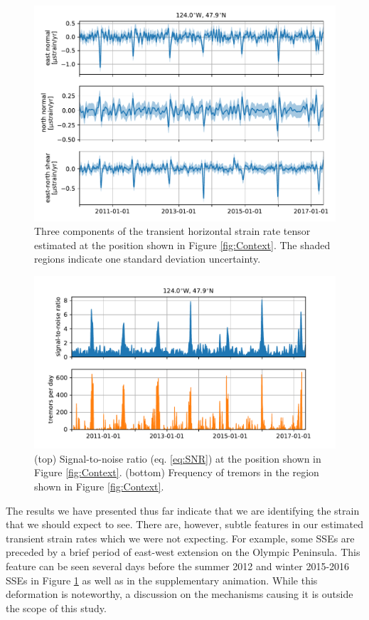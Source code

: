 \documentclass[extra,mreferee]{gji}
\begin{document}
\begin{figure}
\includegraphics{figures/strain_ts/strain-ts.pdf}
\caption{
Three components of the transient horizontal strain rate tensor
estimated at the position shown in Figure \ref{fig:Context}. The
shaded regions indicate one standard deviation uncertainty.
}   
\label{fig:StrainTs}
\end{figure}

\begin{figure}
\includegraphics{figures/strain_ts/mag-ts.pdf}
\caption{
(top) Signal-to-noise ratio (eq. \ref{eq:SNR}) at the position shown
in Figure \ref{fig:Context}. (bottom) Frequency of tremors in the
region shown in Figure \ref{fig:Context}.
}   
\label{fig:StrainMag}
\end{figure}

The results we have presented thus far indicate that we are
identifying the strain that we should expect to see. There are,
however, subtle features in our estimated transient strain rates which
we were not expecting. For example, some SSEs are preceded by a brief
period of east-west extension on the Olympic Peninsula. This feature
can be seen several days before the summer 2012 and winter 2015-2016
SSEs in Figure \ref{fig:StrainTs} as well as in the supplementary
animation. While this deformation is noteworthy, a discussion on the
mechanisms causing it is outside the scope of this study.
\end{document}
